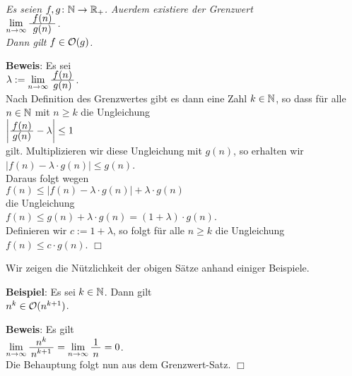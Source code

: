 \begin{Satz} \label{limit}
{\em
  Es seien $f,g \colon {\mathbb N} \rightarrow {{\mathbb R}_+}$.  Au\3erdem existiere der Grenzwert \\[0.1cm]
  \hspace*{1.3cm} $\lim\limits_{n \rightarrow \infty} \bruch{\,f(n)\,}{g(n)}$.  \\[0.1cm]
  Dann gilt $f \in \mathcal{O}(g)$. 
}
\end{Satz}
\textbf{Beweis}: Es sei \\[0.1cm]
\hspace*{1.3cm} $\lambda := \lim\limits_{n \rightarrow \infty} \bruch{f(n)}{g(n)}$.  \\[0.1cm]
Nach Definition des Grenzwertes gibt es dann eine Zahl $k \in {\mathbb N}$, so dass 
f\"ur alle $n\in {\mathbb N}$ mit $n \geq k$ die Ungleichung \\[0.1cm]
\hspace*{1.3cm} $\left| \bruch{f(n)}{g(n)} - \lambda \right| \leq 1$ \\[0.1cm]
gilt.  Multiplizieren wir diese Ungleichung mit $g(n)$, so erhalten wir \\[0.1cm]
\hspace*{1.3cm} $|f(n) - \lambda \cdot g(n)| \leq g(n)$. \\[0.1cm]
Daraus folgt wegen \\[0.1cm]
\hspace*{1.3cm} $f(n) \leq \bigl|f(n) - \lambda \cdot g(n)\bigr| + \lambda \cdot g(n)$ \\[0.1cm]
die Ungleichung \\[0.1cm]
\hspace*{1.3cm} $f(n) \leq g(n) + \lambda \cdot g(n) = (1 + \lambda) \cdot g(n)$. \\[0.1cm]
Definieren wir  $c := 1 +  \lambda$, 
so folgt f\"ur alle $n \geq k$ die Ungleichung $f(n) \leq c \cdot g(n)$. \hspace*{\fill} $\Box$
\vspace*{0.3cm}

\noindent
Wir zeigen die N\"utzlichkeit der obigen S\"atze anhand einiger Beispiele.
\vspace*{0.3cm}

\noindent
\textbf{Beispiel}: Es sei $k \in {\mathbb N}$.  Dann gilt\\[0.1cm]
\hspace*{1.3cm} $n^k \in \mathcal{O}(n^{k+1})$.
\vspace*{0.3cm}

\noindent
\textbf{Beweis}: Es gilt \\[0.1cm]
\hspace*{1.3cm} 
$\lim\limits_{n \rightarrow \infty} \bruch{n^{k}}{n^{k+1}} = \lim\limits_{n \rightarrow   \infty} \bruch{1}{n} = 0$.
\\[0.1cm]
Die Behauptung folgt nun aus dem Grenzwert-Satz. \hspace*{\fill} $\Box$
\vspace*{0.3cm}

